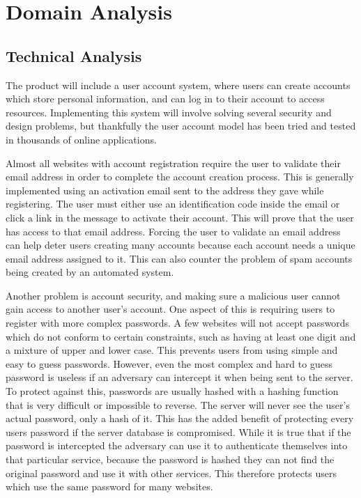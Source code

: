\section{Domain Analysis}
	\subsection{Technical Analysis}
		The product will include a user account system, where users can create accounts which store personal information, and can log in to their account to access resources. Implementing this system will involve solving several security and design problems, but thankfully the user account model has been tried and tested in thousands of online applications.

		Almost all websites with account registration require the user to validate their email address in order to complete the account creation process. This is generally implemented using an activation email sent to the address they gave while registering. The user must either use an identification code inside the email or click a link in the message to activate their account. This will prove that the user has access to that email address. Forcing the user to validate an email address can help deter users creating many accounts because each account needs a unique email address assigned to it. This can also counter the problem of spam accounts being created by an automated system.

		Another problem is account security, and making sure a malicious user cannot gain access to another user's account. One aspect of this is requiring users to register with more complex passwords. A few websites will not accept passwords which do not conform to certain constraints, such as having at least one digit and a mixture of upper and lower case. This prevents users from using simple and easy to guess passwords. However, even the most complex and hard to guess password is useless if an adversary can intercept it when being sent to the server. To protect against this, passwords are usually hashed with a hashing function that is very difficult or impossible to reverse. The server will never see the user's actual password, only a hash of it. This has the added benefit of protecting every users password if the server database is compromised. While it is true that if the password is intercepted the adversary can use it to authenticate themselves into that particular service, because the password is hashed they can not find the original password and use it with other services. This therefore protects users which use the same password for many websites.

